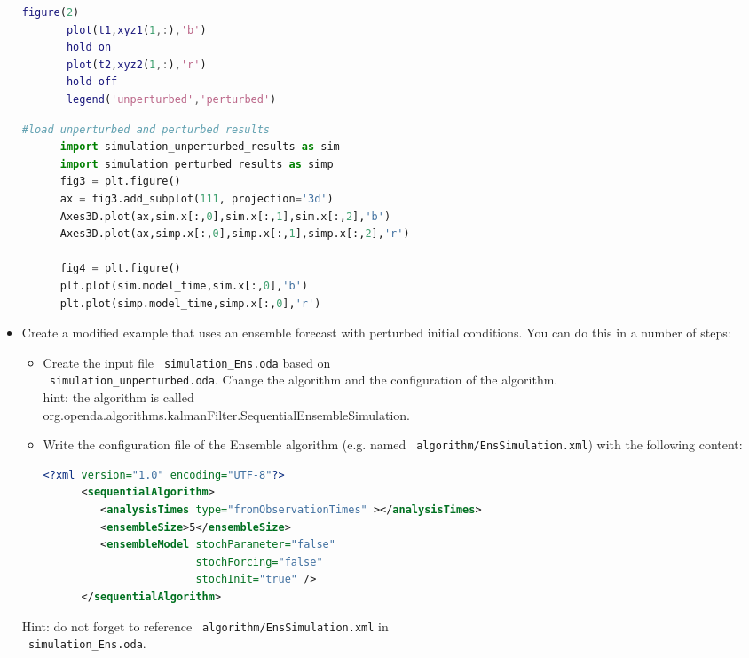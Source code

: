 \begin{itemize}
\begin{lstlisting}[language=Matlab,frame=single,caption={Matlab}]
       figure(2)
       plot(t1,xyz1(1,:),'b')
       hold on
       plot(t2,xyz2(1,:),'r')
       hold off
       legend('unperturbed','perturbed')
      \end{lstlisting}
      \begin{lstlisting}[language=Python,frame=single,caption={Python}]
      #load unperturbed and perturbed results
      import simulation_unperturbed_results as sim
      import simulation_perturbed_results as simp
      fig3 = plt.figure()
      ax = fig3.add_subplot(111, projection='3d')
      Axes3D.plot(ax,sim.x[:,0],sim.x[:,1],sim.x[:,2],'b')
      Axes3D.plot(ax,simp.x[:,0],simp.x[:,1],simp.x[:,2],'r')

      fig4 = plt.figure()
      plt.plot(sim.model_time,sim.x[:,0],'b')
      plt.plot(simp.model_time,simp.x[:,0],'r')
      \end{lstlisting}

\item Create a modified example that uses an ensemble forecast with perturbed
      initial conditions. You can do this in a number of steps:
      \begin{itemize}
      \item Create the input file \texttt{ simulation\_Ens.oda} based on\\
            \texttt{ simulation\_unperturbed.oda}. Change the algorithm and the
            configuration of the algorithm.\\
            hint: the algorithm is called \\
            org.openda.algorithms.kalmanFilter.SequentialEnsembleSimulation.
      \item Write the configuration file of the Ensemble algorithm (e.g. named
            \texttt{ algorithm/EnsSimulation.xml}) with the following content:
      \begin{lstlisting}[language=XML,frame=single,caption={XML-input for sequentialAlgorithm}]
      <?xml version="1.0" encoding="UTF-8"?>
      <sequentialAlgorithm>
         <analysisTimes type="fromObservationTimes" ></analysisTimes>
         <ensembleSize>5</ensembleSize>
         <ensembleModel stochParameter="false"
                        stochForcing="false"
                        stochInit="true" />
      </sequentialAlgorithm>
      \end{lstlisting}
      \end{itemize}
      Hint: do not forget to reference \texttt{ algorithm/EnsSimulation.xml} in \\ \texttt{ simulation\_Ens.oda}.




\end{itemize}
